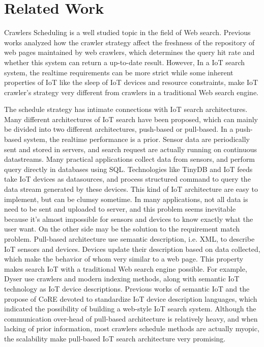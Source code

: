 \documentclass[conference]{IEEEtran}
\begin{document}
\section{Related Work}

Crawlers Scheduling is a well studied topic in the field of Web search. Previous works\cite{Cho2000}\cite{Wolf2002}\cite{Challenger2004} analyzed how the crawler strategy affect the freshness of the repository of web pages maintained by web crawlers, which determines the query hit rate and whether this system can return a up-to-date result. However, In a IoT search system, the realtime requirements can be more strict while some inherent properties of IoT like the sleep of IoT devices and resource constraints, make IoT crawler's strategy very different from crawlers in a traditional Web search engine. 


The schedule strategy has intimate connections with IoT search architectures.
Many different architectures of IoT search have been proposed, which can mainly be divided into two different architectures, push-based or pull-based.
In a push-based system, the realtime performance is a prior. Sensor data are periodically sent and stored in servers, and search request are actually running on continuous datastreams. Many practical applications collect data from sensors, and perform query directly in databases using SQL. Technologies like TinyDB\cite{TinyDB} and IoT feeds\cite{Whitehouse2006} take IoT devices as datasources, and process structured command to query the data stream generated by these devices. This kind of IoT architecture are easy to implement, but can be clumsy sometime. In many applications, not all data is need to be sent and uploaded to server, and this problem seems inevitable because it's almost impossible for sensors and devices to know exactly what the user want.
On the other side may be the solution to the requirement match problem.
Pull-based architecture use semantic description, i.e. XML, to describe IoT sensors and devices. Devices update their description based on data collected, which make the behavior of whom very similar to a web page. This property makes search IoT with a traditional Web search engine possible. For example, Dyser\cite{Dyser} use crawlers and modern indexing methods, along with semantic IoT technology as IoT device descriptions. Previous works of semantic IoT\cite{Compton2012} and the propose of CoRE\cite{CoREWorkingGroup2012} devoted to standardize IoT device description languages, which indicated the possibility of building a web-style IoT search system. Although the communication over-head of pull-based architecture is relatively heavy, and when lacking of prior information, most crawlers schedule methods are actually myopic, the scalability make pull-based IoT search architecture very promising.
\end{document}
